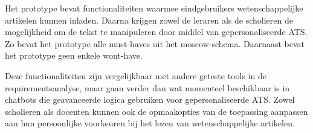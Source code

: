 Het prototype bevat functionaliteiten waarmee eindgebruikers wetenschappelijke artikelen kunnen inladen. Daarna krijgen zowel de leraren als de scholieren de mogelijkheid om de tekst te manipuleren door middel van gepersonaliseerde ATS. Zo bevat het prototype alle must-haves uit het moscow-schema. Daarnaast bevat het prototype geen enkele wont-have.

Deze functionaliteiten zijn vergelijkbaar met andere geteste tools in de requirementsanalyse, maar gaan verder dan wat momenteel beschikbaar is in chatbots die geavanceerde logica gebruiken voor gepersonaliseerde ATS. Zowel scholieren als docenten kunnen ook de opmaakopties van de toepassing aanpassen aan hun persoonlijke voorkeuren bij het lezen van wetenschappelijke artikelen. 

